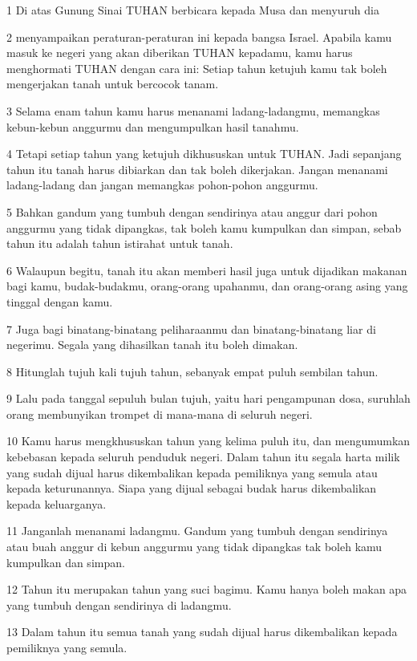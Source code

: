 \par 1 Di atas Gunung Sinai TUHAN berbicara kepada Musa dan menyuruh dia
\par 2 menyampaikan peraturan-peraturan ini kepada bangsa Israel. Apabila kamu masuk ke negeri yang akan diberikan TUHAN kepadamu, kamu harus menghormati TUHAN dengan cara ini: Setiap tahun ketujuh kamu tak boleh mengerjakan tanah untuk bercocok tanam.
\par 3 Selama enam tahun kamu harus menanami ladang-ladangmu, memangkas kebun-kebun anggurmu dan mengumpulkan hasil tanahmu.
\par 4 Tetapi setiap tahun yang ketujuh dikhususkan untuk TUHAN. Jadi sepanjang tahun itu tanah harus dibiarkan dan tak boleh dikerjakan. Jangan menanami ladang-ladang dan jangan memangkas pohon-pohon anggurmu.
\par 5 Bahkan gandum yang tumbuh dengan sendirinya atau anggur dari pohon anggurmu yang tidak dipangkas, tak boleh kamu kumpulkan dan simpan, sebab tahun itu adalah tahun istirahat untuk tanah.
\par 6 Walaupun begitu, tanah itu akan memberi hasil juga untuk dijadikan makanan bagi kamu, budak-budakmu, orang-orang upahanmu, dan orang-orang asing yang tinggal dengan kamu.
\par 7 Juga bagi binatang-binatang peliharaanmu dan binatang-binatang liar di negerimu. Segala yang dihasilkan tanah itu boleh dimakan.
\par 8 Hitunglah tujuh kali tujuh tahun, sebanyak empat puluh sembilan tahun.
\par 9 Lalu pada tanggal sepuluh bulan tujuh, yaitu hari pengampunan dosa, suruhlah orang membunyikan trompet di mana-mana di seluruh negeri.
\par 10 Kamu harus mengkhususkan tahun yang kelima puluh itu, dan mengumumkan kebebasan kepada seluruh penduduk negeri. Dalam tahun itu segala harta milik yang sudah dijual harus dikembalikan kepada pemiliknya yang semula atau kepada keturunannya. Siapa yang dijual sebagai budak harus dikembalikan kepada keluarganya.
\par 11 Janganlah menanami ladangmu. Gandum yang tumbuh dengan sendirinya atau buah anggur di kebun anggurmu yang tidak dipangkas tak boleh kamu kumpulkan dan simpan.
\par 12 Tahun itu merupakan tahun yang suci bagimu. Kamu hanya boleh makan apa yang tumbuh dengan sendirinya di ladangmu.
\par 13 Dalam tahun itu semua tanah yang sudah dijual harus dikembalikan kepada pemiliknya yang semula.
